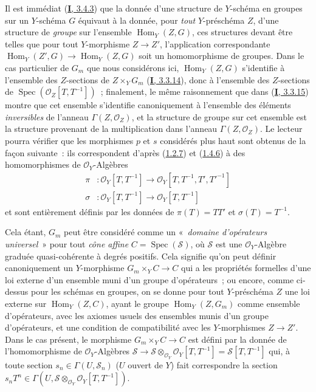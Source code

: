 \begin{remark}[8.3.9]
Il est immédiat (\hyperref[I.3.4.3-fr]{\textbf{I}, 3.4.3}) que la donnée d'une structure
de $Y$-schéma en groupes sur un $Y$-schéma $G$ équivaut à la donnée, pour
\emph{tout} $Y$-préschéma $Z$, d'une structure de \emph{groupe} sur
l'ensemble $\operatorname{Hom}_Y(Z,G)$, ces structures devant être telles que
pour tout $Y$-morphisme $Z\to Z'$, l'application correspondante
$\operatorname{Hom}_Y(Z',G)\to\operatorname{Hom}_Y(Z,G)$ soit un
homomorphisme de groupes. Dans le cas particulier de $G_m$ que nous
considérons ici, $\operatorname{Hom}_Y(Z,G)$ s'identifie à l'ensemble des
$Z$-sections de $Z\times_YG_m$ (\hyperref[I.3.3.14-fr]{\textbf{I}, 3.3.14}), donc à
l'ensemble des $Z$-sections de
$\operatorname{Spec}(\mathcal{O}_Z[T,T^{-1}])$~; finalement, le même
raisonnement que dans (\hyperref[I.3.3.15-fr]{\textbf{I}, 3.3.15}) montre que cet
ensemble s'identifie canoniquement à l'ensemble des éléments \emph{inversibles}
de l'anneau $\Gamma(Z,\mathcal{O}_Z)$, et la structure de groupe sur cet
ensemble est la structure provenant de la multiplication dans l'anneau
$\Gamma(Z,\mathcal{O}_Z)$. Le lecteur pourra vérifier que les morphismes $p$
et $s$ considérés plus haut sont obtenus de la façon suivante~: ils
correspondent d'après (\hyperref[II.1.2.7-fr]{1.2.7}) et
(\hyperref[II.1.4.6-fr]{1.4.6}) à des homomorphismes de $\mathcal{O}_Y$-Algèbres
\begin{align*}
  \pi &: \mathcal{O}_Y[T,T^{-1}]
  \to\mathcal{O}_Y[T,T^{-1},T',T'^{-1}]\\
  \sigma &: \mathcal{O}_Y[T,T^{-1}]\to\mathcal{O}_Y[T,T^{-1}]
\end{align*}
et sont entièrement définis par les données de $\pi(T)=TT'$ et
$\sigma(T)=T^{-1}$.

Cela étant, $G_m$ peut être considéré comme un «~\emph{domaine d'opérateurs
universel}~» pour tout \emph{cône affine}
$C=\operatorname{Spec}(\mathcal{S})$, où $\mathcal{S}$ est une
$\mathcal{O}_Y$-Algèbre graduée quasi-cohérente à degrés positifs. Cela
signifie qu'on peut définir canoniquement un $Y$-morphisme
$G_m\times_YC\to C$ qui a les propriétés formelles d'une loi externe d'un
ensemble muni d'un groupe d'opérateurs~; ou encore, comme ci-dessus pour les
schémas en groupes, on se donne pour tout $Y$-préschéma $Z$ une loi externe
sur $\operatorname{Hom}_Y(Z,C)$, ayant le groupe
$\operatorname{Hom}_Y(Z,G_m)$ comme ensemble d'opérateurs, avec les axiomes
usuels des ensembles munis d'un groupe d'opérateurs, et une condition de
compatibilité avec les $Y$-morphismes $Z\to Z'$. Dans le cas présent, le
morphisme $G_m\times_YC\to C$ est défini par la donnée de l'homomorphisme de
$\mathcal{O}_Y$-Algèbres
$\mathcal{S}\to\mathcal{S}\otimes_{\mathcal{O}_Y}\mathcal{O}_Y[T,T^{-1}]=\mathcal{S}[T,T^{-1}]$
qui, à toute section $s_n\in\Gamma(U,\mathcal{S}_n)$ ($U$ ouvert de $Y$) fait
correspondre la section
$s_nT^n\in\Gamma(U,\mathcal{S}\otimes_{\mathcal{O}_Y}
\mathcal{O}_Y[T,T^{-1}])$.


\end{remark}
